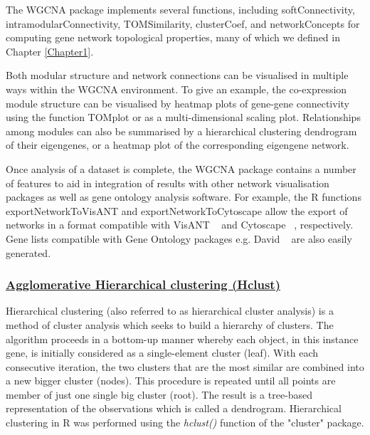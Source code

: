 
The WGCNA package implements several functions, including softConnectivity, intramodularConnectivity, TOMSimilarity, clusterCoef, and networkConcepts for computing gene network topological properties, many of which we defined in Chapter \ref{Chapter1}.


Both modular structure and network connections can be visualised in multiple ways within the WGCNA environment. To give an example, the co-expression module structure can be visualised by heatmap plots of gene-gene connectivity using the function TOMplot or as a multi-dimensional scaling plot. Relationships among modules can also be summarised by a hierarchical clustering dendrogram of their eigengenes, or a heatmap plot of the corresponding eigengene network. 


Once analysis of a dataset is complete, the WGCNA package contains a number of features to aid in integration of results with other network visualisation packages as well as gene ontology analysis software. For example, the R functions exportNetworkToVisANT and exportNetworkToCytoscape allow the export of networks in a format compatible with VisANT ~\autocite{Hu2008} and Cytoscape ~\autocite{Sha2003}, respectively. Gene lists compatible with Gene Ontology packages e.g. David ~\autocite{Den2003} are also easily generated. 

\subsubsection{\underline{Agglomerative Hierarchical clustering (Hclust)}}

Hierarchical clustering (also referred to as hierarchical cluster analysis) is a method of cluster analysis which seeks to build a hierarchy of clusters. The algorithm proceeds in a bottom-up manner whereby each object, in this instance gene, is initially considered as a single-element cluster (leaf). With each consecutive iteration, the two clusters that are the most similar are combined into a new bigger cluster (nodes). This procedure is repeated until all points are member of just one single big cluster (root). The result is a tree-based representation of the observations which is called a dendrogram. Hierarchical clustering in R was performed using the \textit{hclust()} function of the "cluster" package. 


